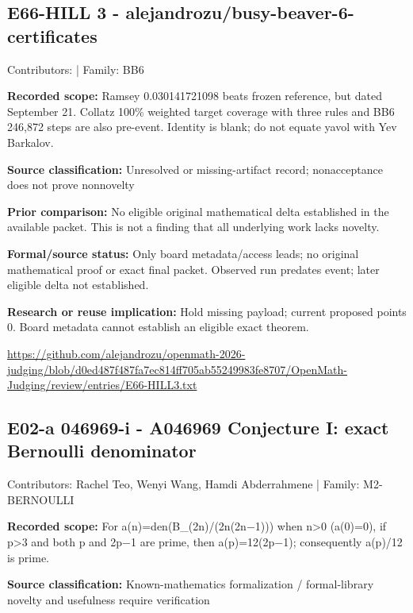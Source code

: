 \documentclass[11pt,a4paper]{article}
\begin{document}
\begin{samepage}
\subsection{E66-HILL 3  -  alejandrozu/busy-beaver-6-certificates}
{\small Contributors:  | Family: BB6\par}

\textbf{Recorded scope:} Ramsey 0.030141721098 beats frozen reference, but dated September 21. Collatz 100\% weighted target coverage with three rules and BB6 246,872 steps are also pre-event. Identity is blank; do not equate yavol with Yev Barkalov.

\end{samepage}
\textbf{Source classification:} Unresolved or missing-artifact record; nonacceptance does not prove nonnovelty

\textbf{Prior comparison:} No eligible original mathematical delta established in the available packet. This is not a finding that all underlying work lacks novelty.

\textbf{Formal/source status:} Only board metadata/access leads; no original mathematical proof or exact final packet. Observed run predates event; later eligible delta not established.

\textbf{Research or reuse implication:} Hold missing payload; current proposed points 0. Board metadata cannot establish an eligible exact theorem.

{\small \url{https://github.com/alejandrozu/openmath-2026-judging/blob/d0ed487f487fa7ec814ff705ab55249983fe8707/OpenMath-Judging/review/entries/E66-HILL3.txt}\par}

\begin{samepage}
\subsection{E02-a 046969-i  -  A046969 Conjecture I: exact Bernoulli denominator}
{\small Contributors: Rachel Teo, Wenyi Wang, Hamdi Abderrahmene | Family: M2-BERNOULLI\par}

\textbf{Recorded scope:} For a(n)=den(B\_(2n)/(2n(2n\ensuremath{-}1))) when n>0 (a(0)=0), if p>3 and both p and 2p\ensuremath{-}1 are prime, then a(p)=12(2p\ensuremath{-}1); consequently a(p)/12 is prime.

\end{samepage}
\textbf{Source classification:} Known-mathematics formalization / formal-library novelty and usefulness require verification
\end{document}
